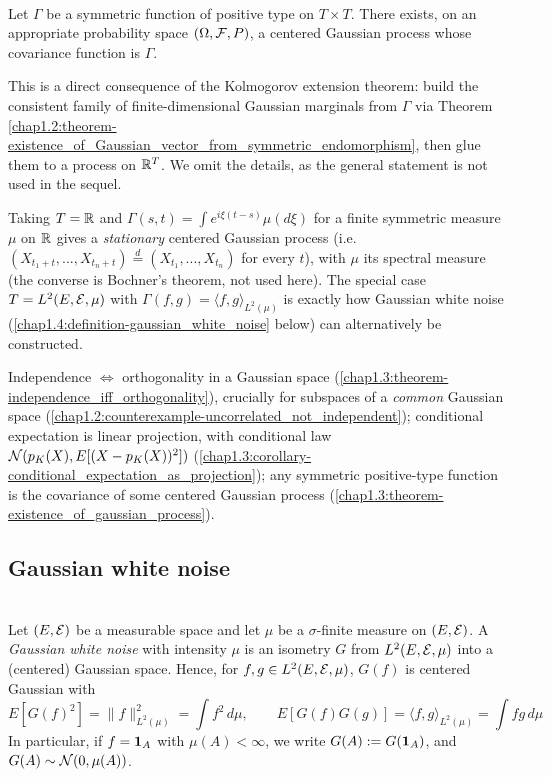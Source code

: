 \begin{theorem}[Existence] \label{chap1.3:theorem-existence_of_gaussian_process}
 \\
Let $\Gamma$ be a symmetric function of positive type on $T \times T$. There exists, on an appropriate probability space $(\Omega,\mathcal{F},P)$, a centered Gaussian process whose covariance function is $\Gamma$.
\end{theorem}
\begin{proofidea}
This is a direct consequence of the Kolmogorov extension theorem: build the consistent family of finite-dimensional Gaussian marginals from $\Gamma$ via Theorem \ref{chap1.2:theorem-existence_of_Gaussian_vector_from_symmetric_endomorphism}, then glue them to a process on $\mathbb{R}^T$. We omit the details, as the general statement is not used in the sequel.
\end{proofidea}
\begin{usedin}
Taking $T=\mathbb{R}$ and $\Gamma(s,t)=\int e^{i\xi(t-s)}\mu(d\xi)$ for a finite symmetric measure $\mu$ on $\mathbb{R}$ gives a \textit{stationary} centered Gaussian process (i.e.\ $(X_{t_1+t},...,X_{t_n+t})\overset{d}{=}(X_{t_1},...,X_{t_n})$ for every $t$), with $\mu$ its spectral measure (the converse is Bochner's theorem, not used here). The special case $T=L^2(E,\mathcal{E},\mu)$ with $\Gamma(f,g)=\langle f,g\rangle_{L^2(\mu)}$ is exactly how Gaussian white noise (\cref{chap1.4:definition-gaussian_white_noise} below) can alternatively be constructed.
\end{usedin}
\begin{quizbox} Independence $\iff$ orthogonality in a Gaussian space (\cref{chap1.3:theorem-independence_iff_orthogonality}), crucially for subspaces of a \emph{common} Gaussian space (\cref{chap1.2:counterexample-uncorrelated_not_independent}); conditional expectation is linear projection, with conditional law $\mathcal{N}(p_K(X),E[(X-p_K(X))^2])$ (\cref{chap1.3:corollary-conditional_expectation_as_projection}); any symmetric positive-type function is the covariance of some centered Gaussian process (\cref{chap1.3:theorem-existence_of_gaussian_process}). \end{quizbox}

\subsection{Gaussian white noise}
\begin{definition} \label{chap1.4:definition-gaussian_white_noise}
 \\
Let $(E,\mathcal{E})$ be a measurable space and let $\mu$ be a $\sigma$-finite measure on $(E,\mathcal{E})$. A \textit{Gaussian white noise} with intensity $\mu$ is an isometry $G$ from $L^2(E,\mathcal{E},\mu)$ into a (centered) Gaussian space. Hence, for $f,g \in L^2(E,\mathcal{E},\mu)$, $G(f)$ is centered Gaussian with
$$E[G(f)^2]=\|f\|^2_{L^2(\mu)}=\int f^2\,d\mu, \qquad E[G(f)G(g)]=\langle f,g\rangle_{L^2(\mu)}=\int fg\,d\mu$$
In particular, if $f=\mathbf{1}_A$ with $\mu(A)<\infty$, we write $G(A):=G(\mathbf{1}_A)$, and $G(A)\sim\mathcal{N}(0,\mu(A))$.
\end{definition}

